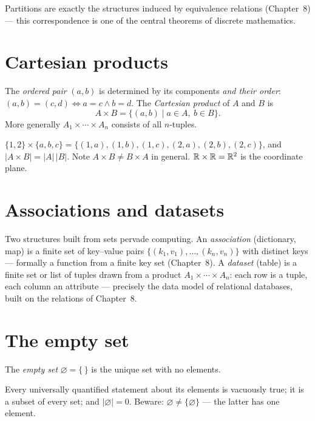 Partitions are exactly the structures induced by equivalence relations
(Chapter~8) --- this correspondence is one of the central theorems of discrete
mathematics.

\section{Cartesian products}

\begin{definition}
The \emph{ordered pair} $(a,b)$ is determined by its components \emph{and
their order}: $(a,b) = (c,d) \iff a = c \wedge b = d$. The \emph{Cartesian
product} of $A$ and $B$ is
\[
A \times B = \{(a, b) \mid a \in A,\ b \in B\}.
\]
More generally $A_1 \times \cdots \times A_n$ consists of all $n$-tuples.
\end{definition}

\begin{example}
$\{1,2\} \times \{a,b,c\} =
\{(1,a),(1,b),(1,c),(2,a),(2,b),(2,c)\}$, and
$|A \times B| = |A|\,|B|$. Note $A \times B \neq B \times A$ in general.
$\mathbb{R} \times \mathbb{R} = \mathbb{R}^2$ is the coordinate plane.
\end{example}

\section{Associations and datasets}

Two structures built from sets pervade computing. An \emph{association}
(dictionary, map) is a finite set of key--value pairs
$\{(k_1, v_1), \ldots, (k_n, v_n)\}$ with distinct keys --- formally a
function from a finite key set (Chapter~8). A \emph{dataset} (table) is a
finite set or list of tuples drawn from a product
$A_1 \times \cdots \times A_n$: each row is a tuple, each column an attribute
--- precisely the data model of relational databases, built on the relations
of Chapter~8.

\section{The empty set}

\begin{definition}
The \emph{empty set} $\varnothing = \{\,\}$ is the unique set with no
elements.
\end{definition}

Every universally quantified statement about its elements is vacuously true;
it is a subset of every set; and $|\varnothing| = 0$. Beware:
$\varnothing \neq \{\varnothing\}$ --- the latter has one element.

